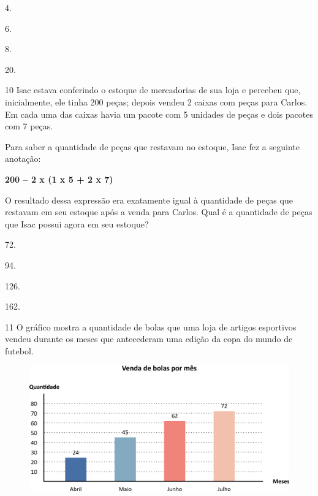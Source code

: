 \begin{escolha}
\item
  4.
\item
  6.
\item
  8.
\item
  20.
\end{escolha}

\num{10} Isac estava conferindo o estoque de mercadorias de sua loja e percebeu que, inicialmente, ele tinha 200 peças; depois vendeu 2 caixas com peças para Carlos. Em cada uma das caixas havia um pacote com 5 unidades de peças e dois pacotes com 7 peças.

Para saber a quantidade de peças que restavam no estoque, Isac fez a seguinte anotação:

\begin{myquote}
\centering
\textbf{200 -- 2 x (1 x 5 + 2 x 7)}
\end{myquote}

O resultado dessa expressão era exatamente igual à quantidade de peças que restavam em seu estoque após a venda para Carlos. Qual é a quantidade de peças que Isac possui agora em seu estoque?

\begin{escolha}
\item
  72.
\item
  94.
\item
  126.
\item
  162.
\end{escolha}

\num{11} O gráfico mostra a quantidade de bolas que uma loja de artigos esportivos vendeu durante os meses que antecederam uma edição da copa do mundo de futebol.

\begin{figure}[htpb!]
\centering
\includegraphics[width=\textwidth]{./media/image105.png}
\end{figure}

